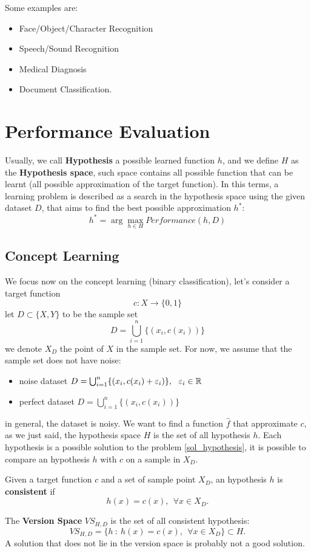 \documentclass[10pt, letterpaper]{report}
\begin{document}
\bigskip
Some examples are:\begin{itemize}
	\item Face/Object/Character Recognition
	\item Speech/Sound Recognition
	\item Medical Diagnosis
	\item Document Classification.
\end{itemize}

\bigskip
\section{Performance Evaluation}
Usually, we call \textbf{Hypothesis} a possible learned function $h$, and we define $H$ as the \textbf{Hypothesis space}, such space contains all possible function that can be learnt (all possible approximation of the target function). In this terms, a learning problem is described as a search in the hypothesis space using the given dataset $D$, that aims to find the best possible approximation $h^*$:\begin{equation}\label{sol_hypothesis}
	h^*=\arg \max_{h\in H} Performance(h,D)
\end{equation}
\subsection{Concept Learning}
We focus now on the concept learning (binary classification), let's consider a target function\begin{equation}
	c:X\rightarrow \{0,1\}
\end{equation}
let $D\subset \{X,Y\}$ to be the sample set\begin{equation}
	D=\bigcup_{i=1}^n\{(x_i,c(x_i))\}
\end{equation}
we denote $X_D$ the point of $X$ in the sample set. For now, we assume that the sample set does not have noise:\begin{itemize}
	\item noise dataset $D=\bigcup_{i=1}^n\{(x_i,c(x_i)+\varepsilon_i)\}, \ \ \varepsilon_i\in\R$
	\item perfect dataset $D=\bigcup_{i=1}^n\{(x_i,c(x_i))\}$
\end{itemize}
in general, the dataset is noisy. We want to find a function $\hat f$ that approximate $c$, as we just said, the hypothesis space $H$ is the set of all hypothesis $h$.\bigskip
Each hypothesis is a possible solution to the problem \eqref{sol_hypothesis},  it is possible to compare an hypothesis  $h$ with $c$ on a sample in $X_D$.
\begin{definition}
	Given a target function $c$ and a set of sample point $X_D$, an hypothesis $h$ is \textbf{consistent} if\begin{equation}
		h(x)=c(x), \ \ \forall x\in X_D.
	\end{equation}
\end{definition}
The \textbf{Version Space} $VS_{H,D}$ is the set of all consistent hypothesis:\begin{equation}
	VS_{H,D}=\{h \ : \ h(x)=c(x), \ \ \forall x\in X_D\}\subset H.
\end{equation}
A solution that does not lie in the version space is probably not a good solution.\bigskip
\end{document}
